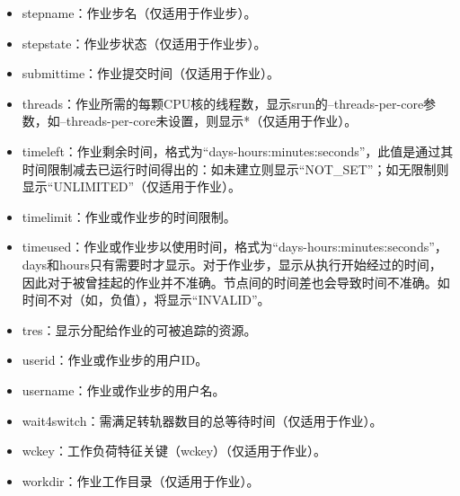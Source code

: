 \begin{itemize}
\begin{itemize}
\begin{itemize}
    \item stepname：作业步名（仅适用于作业步）。
    \item stepstate：作业步状态（仅适用于作业步）。
    \item submittime：作业提交时间（仅适用于作业）。
    \item threads：作业所需的每颗CPU核的线程数，显示srun的--threads-per-core参数，如--threads-per-core未设置，则显示*（仅适用于作业）。
    \item timeleft：作业剩余时间，格式为``days-hours:minutes:seconds''，此值是通过其时间限制减去已运行时间得出的：如未建立则显示``NOT\_SET''；如无限制则显示``UNLIMITED''（仅适用于作业）。
    \item timelimit：作业或作业步的时间限制。
    \item timeused：作业或作业步以使用时间，格式为``days-hours:minutes:seconds''，days和hours只有需要时才显示。对于作业步，显示从执行开始经过的时间，因此对于被曾挂起的作业并不准确。节点间的时间差也会导致时间不准确。如时间不对（如，负值），将显示``INVALID''。
    \item tres：显示分配给作业的可被追踪的资源。
    \item userid：作业或作业步的用户ID。
    \item username：作业或作业步的用户名。
    \item wait4switch：需满足转轨器数目的总等待时间（仅适用于作业）。
    \item wckey：工作负荷特征关键（wckey）（仅适用于作业）。
    \item workdir：作业工作目录（仅适用于作业）。
\end{itemize}
\end{itemize}
\end{itemize}

